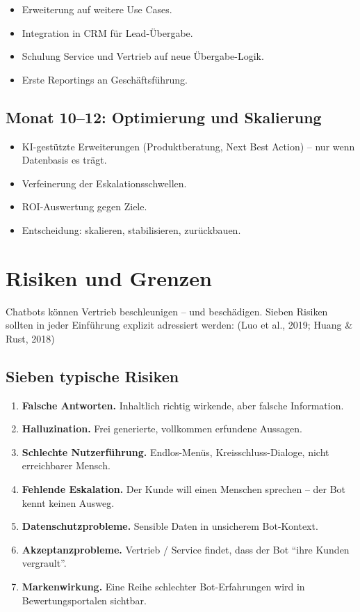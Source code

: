 \documentclass[11pt,a4paper,oneside]{article}
\newcommand{\quelle}[1]{{\footnotesize\color{lpGray}(#1)}}
\begin{document}
\begin{itemize}
  \item Erweiterung auf weitere Use Cases.
  \item Integration in CRM für Lead-Übergabe.
  \item Schulung Service und Vertrieb auf neue Übergabe-Logik.
  \item Erste Reportings an Geschäftsführung.
\end{itemize}

\subsection{Monat 10--12: Optimierung und Skalierung}

\begin{itemize}
  \item KI-gestützte Erweiterungen (Produktberatung, Next Best Action) -- nur wenn Datenbasis es trägt.
  \item Verfeinerung der Eskalationsschwellen.
  \item ROI-Auswertung gegen Ziele.
  \item Entscheidung: skalieren, stabilisieren, zurückbauen.
\end{itemize}

\section{Risiken und Grenzen}

Chatbots können Vertrieb beschleunigen -- und beschädigen. Sieben Risiken sollten in jeder Einführung explizit adressiert werden: \quelle{Luo et al., 2019; Huang \& Rust, 2018}

\subsection{Sieben typische Risiken}

\begin{enumerate}
  \item \textbf{Falsche Antworten.} Inhaltlich richtig wirkende, aber falsche Information.
  \item \textbf{Halluzination.} Frei generierte, vollkommen erfundene Aussagen.
  \item \textbf{Schlechte Nutzerführung.} Endlos-Menüs, Kreisschluss-Dialoge, nicht erreichbarer Mensch.
  \item \textbf{Fehlende Eskalation.} Der Kunde will einen Menschen sprechen -- der Bot kennt keinen Ausweg.
  \item \textbf{Datenschutzprobleme.} Sensible Daten in unsicherem Bot-Kontext.
  \item \textbf{Akzeptanzprobleme.} Vertrieb / Service findet, dass der Bot ``ihre Kunden vergrault''.
  \item \textbf{Markenwirkung.} Eine Reihe schlechter Bot-Erfahrungen wird in Bewertungsportalen sichtbar.
\end{enumerate}
\end{document}
